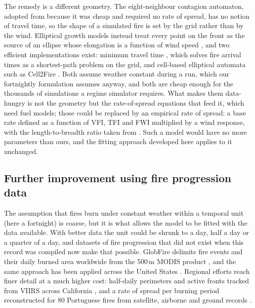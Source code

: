 \documentclass[ResearchPaper,linenum]{CSIRO_LaTeX_Template}
\begin{document}
The remedy is a different geometry. The eight-neighbour contagion automaton, adopted from
\citet{morales_stochastic_2015} because it was cheap and required no rate of spread, has no
notion of travel time, so the shape of a simulated fire is set by the grid rather than by the
wind. Elliptical growth models instead treat every point on the front as the source of an
ellipse whose elongation is a function of wind speed \citep{van_wagner_simple_1969,
anderson_predicting_1983, richards_elliptical_1990}, and two efficient implementations exist:
minimum travel time \citep{finney_fire_2002}, which solves fire arrival times as a
shortest-path problem on the grid, and cell-based elliptical automata such as Cell2Fire
\citep{pais_cell2fire_2021}. Both assume weather constant during a run, which our fortnightly
formulation assumes anyway, and both are cheap enough for the thousands of simulations a
regime simulator requires. What makes them data-hungry is not the geometry but the
rate-of-spread equations that feed it, which need fuel models; those could be replaced by an
empirical rate of spread: a base rate defined as a function of VFI, TFI
and FWI multiplied by a wind response, with the length-to-breadth ratio taken from
\citet{anderson_predicting_1983}. Such a model would have no more parameters than ours, and
the fitting approach developed here applies to it unchanged.

\subsection*{Further improvement using fire progression data}

The assumption that fires burn under constant weather within a temporal unit (here a
fortnight) is coarse, but it is what allows the model to be fitted with the data
available. With better data the unit could be shrunk to a day, half a day or a quarter of a day,
and datasets of fire progression that did not exist when this record was compiled now
make that possible. GlobFire delimits fire events and their daily burned area worldwide
from the 500\,m MODIS product \citep{artes_global_2019}, and the same approach has been
applied across the United States \citep{balch_fired_2020}. Regional efforts reach finer
detail at a much higher cost: half-daily perimeters and active fronts tracked from VIIRS
across California \citep{chen_california_2022}, and a rate of spread per burning period
reconstructed for 80 Portuguese fires from satellite, airborne and ground records
\citep{benali_portuguese_2023}.
\end{document}
